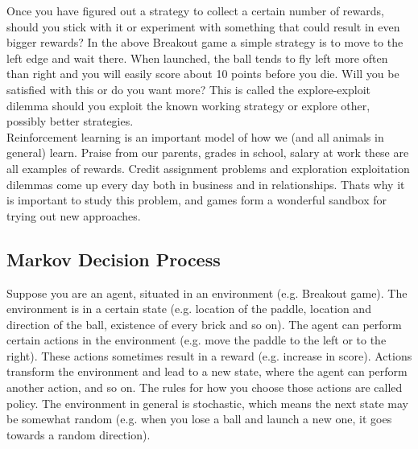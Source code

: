 \documentclass[twoside,letterpaper]{article}
\begin{document}
{\bigskip
Once you have figured out a strategy to collect a certain number of rewards, should you stick with it or experiment with something that could result in even bigger rewards? In the above Breakout game a simple strategy is to move to the left edge and wait there. When launched, the ball tends to fly left more often than right and you will easily score about 10 points before you die. Will you be satisfied with this or do you want more? This is called the explore-exploit dilemma should you exploit the known working strategy or explore other, possibly better strategies.\\
\bigskip
Reinforcement learning is an important model of how we (and all animals in general) learn. Praise from our parents, grades in school, salary at work these are all examples of rewards. Credit assignment problems and exploration exploitation dilemmas come up every day both in business and in relationships. Thats why it is important to study this problem, and games form a wonderful sandbox for trying out new approaches.

\subsection[Markov Decision Process]{\rmfamily\bfseries\color{black}
Markov Decision Process}
{\color{black}
Suppose you are an agent, situated in an environment (e.g. Breakout game). The environment is in a certain state (e.g. location of the paddle, location and direction of the ball, existence of every brick and so on). The agent can perform certain actions in the environment (e.g. move the paddle to the left or to the right). These actions sometimes result in a reward (e.g. increase in score). Actions transform the environment and lead to a new state, where the agent can perform another action, and so on. The rules for how you choose those actions are called policy. The environment in general is stochastic, which means the next state may be somewhat random (e.g. when you lose a ball and launch a new one, it goes towards a random direction).\\

}}
\end{document}
